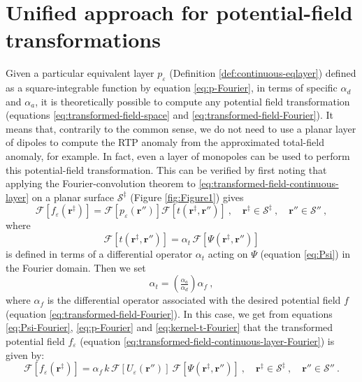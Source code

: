 \section{Unified approach for potential-field transformations}

Given a particular equivalent layer $p_{\varepsilon}$ (Definition \ref{def:continuous-eqlayer}) 
defined as a square-integrable function by equation \ref{eq:p-Fourier}, in terms of specific $\alpha_{d}$ and $\alpha_{a}$, 
it is theoretically possible to compute any potential field transformation (equations \ref{eq:transformed-field-space} and 
\ref{eq:transformed-field-Fourier}).
It means that, contrarily to the common sense, we do not need to use a planar layer of dipoles to compute the RTP anomaly from 
the approximated total-field anomaly, for example. In fact, even a layer of monopoles can be used to perform this potential-field transformation. 
This can be verified by first noting that applying the Fourier-convolution theorem to \ref{eq:transformed-field-continuous-layer} 
on a planar surface $\mathcal{S}^{\ddagger}$ (Figure \ref{fig:Figure1}) gives
\begin{equation}
	\mathcal{F} [ f_{\varepsilon}(\mathbf{r}^{\ddagger}) ] =
	\mathcal{F} \left[ p_{\varepsilon}(\mathbf{r}'') \right]
	\mathcal{F} [ t(\mathbf{r}^{\ddagger}, \mathbf{r}'') ] \: , 
	\quad \mathbf{r}^{\ddagger} \in \mathcal{S}^{\ddagger} \: ,
	\quad \mathbf{r}'' \in \mathcal{S}'' \: ,
	\label{eq:transformed-field-continuous-layer-Fourier}
\end{equation}
where
\begin{equation}
	\mathcal{F} [ t(\mathbf{r}^{\ddagger}, \mathbf{r}'') ] = \alpha_{t} \, \mathcal{F} [ \Psi(\mathbf{r}^{\ddagger}, \mathbf{r}'') ]
	\label{eq:kernel-t-Fourier}
\end{equation}
is defined in terms of a differential operator $\alpha_{t}$ acting on $\Psi$ (equation \ref{eq:Psi}) in the Fourier domain.
Then we set 
\begin{equation}
	\alpha_{t} = \left( \tfrac{\alpha_{a}}{\alpha_{d}} \right) \alpha_{f} \: ,
	\label{eq:alpha-t-generic}
\end{equation}
where $\alpha_{f}$ is the differential operator associated with the desired potential field $f$ (equation \ref{eq:transformed-field-Fourier}).
In this case, we get from equations \ref{eq:Psi-Fourier}, \ref{eq:p-Fourier}  and \ref{eq:kernel-t-Fourier} 
that the transformed potential field $f_{\varepsilon}$ (equation \ref{eq:transformed-field-continuous-layer-Fourier}) 
is given by:
\begin{equation}
	\mathcal{F} [ f_{\varepsilon}(\mathbf{r}^{\ddagger}) ] =
	\alpha_{f} \, k \, \mathcal{F} [ U_{\varepsilon}(\mathbf{r}'') ] \: 
	\mathcal{F} [ \Psi(\mathbf{r}^{\ddagger}, \mathbf{r}'') ] \: , 
	\quad \mathbf{r}^{\ddagger} \in \mathcal{S}^{\ddagger} \: ,
	\quad \mathbf{r}'' \in \mathcal{S}'' \: .
	\label{eq:transformed-field-continuous-layer-Fourier2}
\end{equation}
